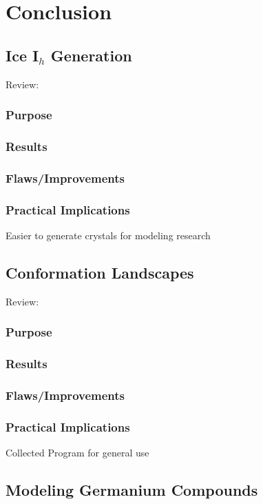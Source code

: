 \chapter{Conclusion}
\label{ch:Conclusion}

\section{Ice I$_{h}$ Generation}

Review:
\subsection{Purpose}
\subsection{Results}
\subsection{Flaws/Improvements}
\subsection{Practical Implications} 
Easier to generate crystals for modeling research

\section{Conformation Landscapes}

Review:
\subsection{Purpose}
\subsection{Results}
\subsection{Flaws/Improvements}
\subsection{Practical Implications} 
Collected Program for general use

\section{Modeling Germanium Compounds}

